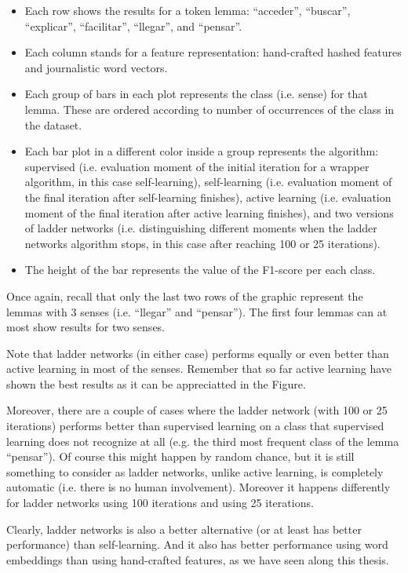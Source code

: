 \begin{itemize}
  \item Each row shows the results for a token lemma: ``acceder'', ``buscar'',
    ``explicar'', ``facilitar'', ``llegar'', and ``pensar''.
  \item Each column stands for a feature representation: hand-crafted hashed
    features and journalistic word vectors.
  \item Each group of bars in each plot represents the class (i.e. sense) for
    that lemma. These are ordered according to number of occurrences of the
    class in the dataset.
  \item Each bar plot in a different color inside a group represents the
    algorithm: supervised (i.e. evaluation moment of the initial iteration for
    a wrapper algorithm, in this case self-learning), self-learning (i.e.
    evaluation moment of the final iteration after self-learning finishes),
    active learning (i.e. evaluation moment of the final iteration after active
    learning finishes), and two versions of ladder networks (i.e.
    distinguishing different moments when the ladder networks algorithm stops,
    in this case after reaching 100 or 25 iterations).
  \item The height of the bar represents the value of the F1-score per each
    class.
\end{itemize}

Once again, recall that only the last two rows of the graphic represent the
lemmas with 3 senses (i.e. ``llegar'' and ``pensar''). The first four lemmas
can at most show results for two senses.

Note that ladder networks (in either case) performs equally or even better than
active learning in most of the senses. Remember that so far active learning
have shown the best results as it can be appreciatted in the Figure.

Moreover, there are a couple of cases where the ladder network (with 100 or 25
iterations) performs better than supervised learning on a class that supervised
learning does not recognize at all (e.g. the third most frequent class of the
lemma ``pensar''). Of course this might happen by random chance, but it is
still something to consider as ladder networks, unlike active learning, is
completely automatic (i.e. there is no human involvement). Moreover it happens
differently for ladder networks using 100 iterations and using 25 iterations.

Clearly, ladder networks is also a better alternative (or at least has better
performance) than self-learning. And it also has better performance using word
embeddings than using hand-crafted features, as we have seen along this thesis.


